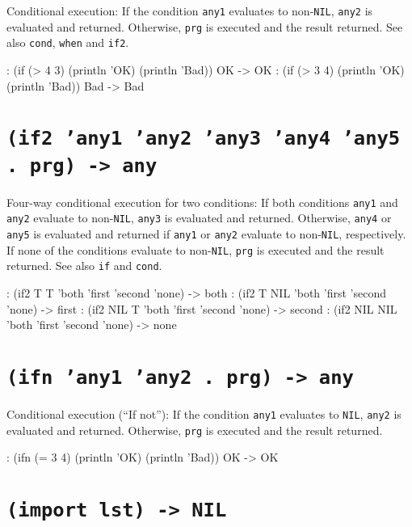 Conditional execution: If the condition \texttt{any1} evaluates to non-\texttt{NIL},
\texttt{any2} is evaluated and returned. Otherwise, \texttt{prg} is executed and the
result returned. See also \texttt{cond}, \texttt{when} and \texttt{if2}.


\begin{wideverbatim}
: (if (> 4 3) (println 'OK) (println 'Bad))
OK
-> OK
: (if (> 3 4) (println 'OK) (println 'Bad))
Bad
-> Bad
\end{wideverbatim}

 
\section*{\texttt{(if2 'any1 'any2 'any3 'any4 'any5 . prg) -> any}}
\label{sec:func-ref-I-(if2 'any1 'any2 'any3 'any4 'any5 . prg) -> any}


Four-way conditional execution for two conditions: If both conditions
\texttt{any1} and \texttt{any2} evaluate to non-\texttt{NIL}, \texttt{any3} is evaluated and
returned. Otherwise, \texttt{any4} or \texttt{any5} is evaluated and returned if
\texttt{any1} or \texttt{any2} evaluate to non-\texttt{NIL}, respectively. If none of the
conditions evaluate to non-\texttt{NIL}, \texttt{prg} is executed and the result
returned. See also \texttt{if} and \texttt{cond}.


\begin{wideverbatim}
: (if2 T T 'both 'first 'second 'none)
-> both
: (if2 T NIL 'both 'first 'second 'none)
-> first
: (if2 NIL T 'both 'first 'second 'none)
-> second
: (if2 NIL NIL 'both 'first 'second 'none)
-> none
\end{wideverbatim}

 
\section*{\texttt{(ifn 'any1 'any2 . prg) -> any}}
\label{sec:func-ref-I-(ifn 'any1 'any2 . prg) -> any}


Conditional execution (``If not''): If the condition \texttt{any1} evaluates to
\texttt{NIL}, \texttt{any2} is evaluated and returned. Otherwise, \texttt{prg} is executed
and the result returned.


\begin{wideverbatim}
: (ifn (= 3 4) (println 'OK) (println 'Bad))
OK
-> OK
\end{wideverbatim}

 
\section*{\texttt{(import lst) -> NIL}}
\label{sec:func-ref-I-(import lst) -> NIL}


